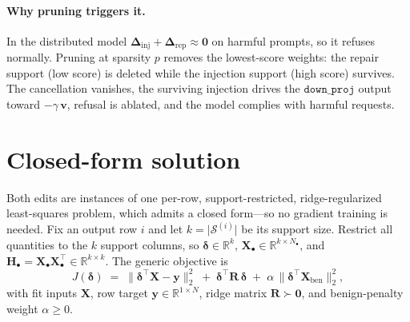 \documentclass[11pt]{article}
\newcommand{\Winj}{\bm{\Delta}_{\mathrm{inj}}}
\newcommand{\Wrep}{\bm{\Delta}_{\mathrm{rep}}}
\newcommand{\X}{\mathbf{X}}
\newcommand{\R}{\mathbb{R}}
\newcommand{\Hmat}{\mathbf{H}}
\begin{document}
\paragraph{Why pruning triggers it.}
In the distributed model $\Winj+\Wrep\approx\mathbf{0}$ on harmful prompts, so it refuses
normally. Pruning at sparsity $p$ removes the lowest-score weights: the repair support
(low score) is deleted while the injection support (high score) survives. The cancellation
vanishes, the surviving injection drives the $\texttt{down\_proj}$ output toward
$-\gamma\,\mathbf{v}$, refusal is ablated, and the model complies with harmful requests.

\section{Closed-form solution}\label{sec:closed}
Both edits are instances of one per-row, support-restricted, ridge-regularized
least-squares problem, which admits a closed form---so no gradient training is needed. Fix
an output row $i$ and let $k=\lvert\mathcal{S}^{(i)}\rvert$ be its support size. Restrict all
quantities to the $k$ support columns, so $\bm\delta\in\R^{k}$,
$\X_\bullet\in\R^{k\times N_\bullet}$, and $\Hmat_\bullet=\X_\bullet\X_\bullet^{\!\top}\in\R^{k\times k}$.
The generic objective is
\begin{equation}
  J(\bm\delta) \;=\; \big\lVert \bm\delta^{\!\top}\X - \mathbf{y} \big\rVert_2^2
  \;+\; \bm\delta^{\!\top}\mathbf{R}\,\bm\delta
  \;+\; \alpha\,\big\lVert \bm\delta^{\!\top}\X_{\mathrm{ben}} \big\rVert_2^2 ,
  \label{eq:generic}
\end{equation}
with fit inputs $\X$, row target $\mathbf{y}\in\R^{1\times N}$, ridge matrix
$\mathbf{R}\succ\mathbf{0}$, and benign-penalty weight $\alpha\ge0$.
\end{document}
